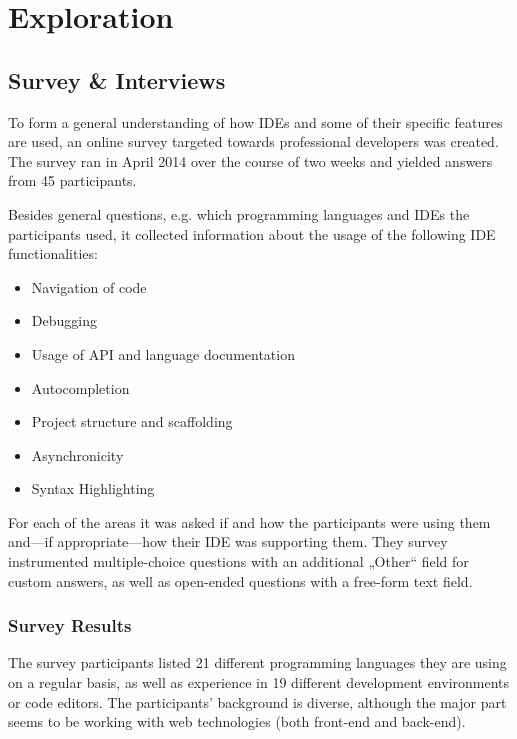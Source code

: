\chapter{Exploration}\label{exploration}

\section{Survey \& Interviews}\label{survey-interviews}

To form a general understanding of how IDEs and some of their specific
features are used, an online survey targeted towards professional
developers was created. The survey ran in April 2014 over the course of
two weeks and yielded answers from 45 participants.

Besides general questions, e.g. which programming languages and IDEs the
participants used, it collected information about the usage of the
following IDE functionalities:

\begin{itemize}
\itemsep1pt\parskip0pt
\item
  Navigation of code
\item
  Debugging
\item
  Usage of API and language documentation
\item
  Autocompletion
\item
  Project structure and scaffolding
\item
  Asynchronicity
\item
  Syntax Highlighting
\end{itemize}

For each of the areas it was asked if and how the participants were
using them and—if appropriate—how their IDE was supporting them. They
survey instrumented multiple-choice questions with an additional „Other“
field for custom answers, as well as open-ended questions with a
free-form text field.

\subsection{Survey Results}\label{survey-results}

The survey participants listed 21 different programming languages they
are using on a regular basis, as well as experience in 19 different
development environments or code editors. The participants’ background
is diverse, although the major part seems to be working with web
technologies (both front-end and back-end).

